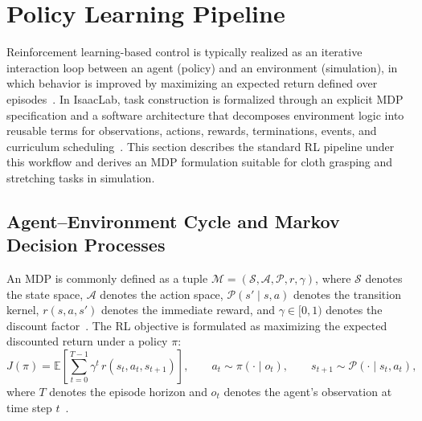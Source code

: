
\section{Policy Learning Pipeline} %
\label{sec:policy_learning}

Reinforcement learning-based control is typically realized as an iterative interaction loop between an agent (policy) and an environment (simulation), in which behavior is improved by maximizing an expected return defined over episodes~\cite{SuttonBarto2018,Puterman1994}. In IsaacLab, task construction is formalized through an explicit \ac{MDP} specification and a software architecture that decomposes environment logic into reusable terms for observations, actions, rewards, terminations, events, and curriculum scheduling~\cite{nvidia_isaaclab_mdp_managers_getting_started,isaaclab_task_design_workflows,isaaclab_mdp_terms_api}. This section describes the standard \ac{RL} pipeline under this workflow and derives an \ac{MDP} formulation suitable for cloth grasping and stretching tasks in simulation.

\subsection{Agent--Environment Cycle and Markov Decision Processes}

An \ac{MDP} is commonly defined as a tuple $\mathcal{M} = (\mathcal{S}, \mathcal{A}, \mathcal{P}, r, \gamma)$, where $\mathcal{S}$ denotes the state space, $\mathcal{A}$ denotes the action space, $\mathcal{P}(s' \mid s, a)$ denotes the transition kernel, $r(s,a,s')$ denotes the immediate reward, and $\gamma \in [0,1)$ denotes the discount factor~\cite{Puterman1994,SuttonBarto2018}. The \ac{RL} objective is formulated as maximizing the expected discounted return under a policy $\pi$:
\begin{equation}
J(\pi) = \mathbb{E}\left[\sum_{t=0}^{T-1} \gamma^t \, r(s_t, a_t, s_{t+1})\right], \qquad a_t \sim \pi(\cdot \mid o_t), \qquad s_{t+1} \sim \mathcal{P}(\cdot \mid s_t, a_t),
\label{eq:mdp_objective_discounted_return}
\end{equation}
where $T$ denotes the episode horizon and $o_t$ denotes the agent's observation at time step $t$~\cite{SuttonBarto2018,Puterman1994}.

